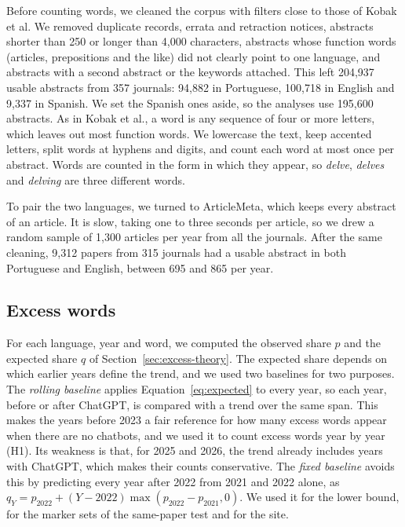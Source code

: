 \documentclass[12pt]{article}
\newcommand{\w}[1]{\textit{#1}}
\begin{document}
Before counting words, we cleaned the corpus with filters close to those of Kobak et al. We removed
duplicate records, errata and retraction notices, abstracts shorter than 250 or longer than 4,000
characters, abstracts whose function words (articles, prepositions and the like) did not clearly
point to one language, and abstracts with a second abstract or the keywords attached. This left
204,937 usable abstracts from 357 journals: 94,882 in Portuguese, 100,718 in English and 9,337 in
Spanish. We set the Spanish ones aside, so the analyses use 195,600 abstracts. As in Kobak et al.,
a word is any sequence of four or more letters, which leaves out most function words. We lowercase
the text, keep accented letters, split words at hyphens and digits, and count each word at most
once per abstract. Words are counted in the form in which they appear, so \w{delve}, \w{delves} and
\w{delving} are three different words.

To pair the two languages, we turned to ArticleMeta, which keeps every abstract of an article. It
is slow, taking one to three seconds per article, so we drew a random sample of 1,300 articles per
year from all the journals. After the same cleaning,
9,312 papers from 315 journals had a usable abstract in both Portuguese and English, between 695
and 865 per year.

\subsection{Excess words}
\label{sec:excess-method}

For each language, year and word, we computed the observed share $p$ and the expected share $q$ of
Section~\ref{sec:excess-theory}. The expected share depends on which earlier years define the trend,
and we used two baselines for two purposes. The \emph{rolling baseline} applies
Equation~\ref{eq:expected} to every year, so each year, before or after ChatGPT, is compared with a
trend over the same span. This makes the years before 2023 a fair reference for how many excess
words appear when there are no chatbots, and we used it to count excess words year by year (H1).
Its weakness is that, for 2025 and 2026, the trend already includes years with ChatGPT, which makes
their counts conservative. The \emph{fixed baseline} avoids this by predicting every year after
2022 from 2021 and 2022 alone, as $q_Y = p_{2022} + (Y - 2022)\max(p_{2022} - p_{2021}, 0)$. We used
it for the lower bound, for the marker sets of the same-paper test and for the site.
\end{document}
